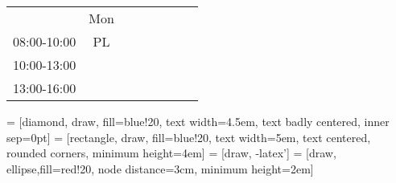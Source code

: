 \begin{table}[!h]
\begin{tabular}{cccccccc}
\end{tabular}
\begin{tabular}{cccccccc}
   & Mon              &          &          &              &                        &                &              \\ \cline{2-2}
   \multicolumn{1}{c|}{08:00-10:00} & \multicolumn{1}{c|}{\cellcolor[HTML]{FCFF2F}PL} &                        &                                                &                        &                                                &                        &                        \\ \cline{2-2}
   \multicolumn{1}{c|}{10:00-13:00} & \multicolumn{1}{c|}{\cellcolor[HTML]{FCFF2F}}   &                        &                                                &                        &                                                &                        &                        \\ \cline{2-2}
   \multicolumn{1}{c|}{13:00-16:00} & \multicolumn{1}{c|}{\cellcolor[HTML]{FCFF2F}}   &                        &                                                &                        &                                                &                        &                        \\ \cline{2-2}
\end{tabular}
\end{table}


 = [diamond, draw, fill=blue!20, 
    text width=4.5em, text badly centered, inner sep=0pt]
 = [rectangle, draw, fill=blue!20, 
    text width=5em, text centered, rounded corners, minimum height=4em]
 = [draw, -latex']
 = [draw, ellipse,fill=red!20, node distance=3cm,
    minimum height=2em]


